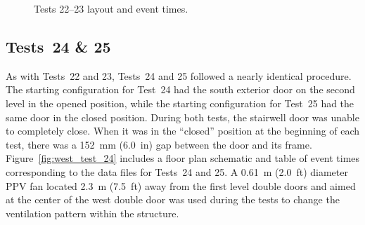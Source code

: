 \begin{figure}[!ht]
\begin{minipage}[b]{\columnwidth}
\end{minipage}
\renewcommand{\baselinestretch}{1}
\caption{Tests 22--23 layout and event times.}
\label{fig:west_test_22}
\end{figure}
\clearpage
\renewcommand{\baselinestretch}{2}

\subsection{Tests~24 \& 25}

As with Tests~22 and 23, Tests~24 and 25 followed a nearly identical procedure. The starting configuration for Test~24 had the south exterior door on the second level in the opened position, while the starting configuration for Test~25 had the same door in the closed position. During both tests, the stairwell door was unable to completely close. When it was in the ``closed'' position at the beginning of each test, there was a 152~mm (6.0~in) gap between the door and its frame. Figure~\ref{fig:west_test_24} includes a floor plan schematic and table of event times corresponding to the data files for Tests~24 and 25. A 0.61~m (2.0~ft) diameter PPV fan located 2.3~m (7.5~ft) away from the first level double doors and aimed at the center of the west double door was used during the tests to change the ventilation pattern within the structure.

